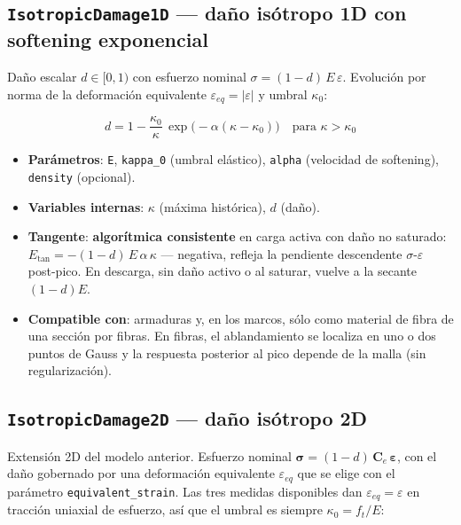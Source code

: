 \documentclass[11pt,oneside]{report}
\begin{document}
\subsection{\texttt{IsotropicDamage1D} --- daño isótropo 1D con softening exponencial}

Daño escalar $d \in [0, 1)$ con esfuerzo nominal $\sigma = (1 - d)\,E\,\varepsilon$. Evolución por norma de la deformación equivalente $\varepsilon_{eq} = |\varepsilon|$ y umbral $\kappa_0$:

\[
d = 1 - \frac{\kappa_0}{\kappa}\,\exp\bigl(-\alpha(\kappa - \kappa_0)\bigr) \quad \text{para } \kappa > \kappa_0
\]

\begin{itemize}
  \item \textbf{Parámetros}: \texttt{E}, \texttt{kappa\_0} (umbral elástico), \texttt{alpha} (velocidad de softening), \texttt{density} (opcional).
  \item \textbf{Variables internas}: $\kappa$ (máxima histórica), $d$ (daño).
  \item \textbf{Tangente}: \textbf{algorítmica consistente} en carga activa con daño no saturado: $E_{\text{tan}} = -(1 - d)\,E\,\alpha\,\kappa$ --- negativa, refleja la pendiente descendente $\sigma$-$\varepsilon$ post-pico. En descarga, sin daño activo o al saturar, vuelve a la secante $(1-d)E$.
  \item \textbf{Compatible con}: armaduras y, en los marcos, sólo como material de fibra de una sección por fibras. En fibras, el ablandamiento se localiza en uno o dos puntos de Gauss y la respuesta posterior al pico depende de la malla (sin regularización).
\end{itemize}

\subsection{\texttt{IsotropicDamage2D} --- daño isótropo 2D}

Extensión 2D del modelo anterior. Esfuerzo nominal $\boldsymbol\sigma = (1-d)\,\mathbf C_e\,\boldsymbol\varepsilon$, con el daño gobernado por una deformación equivalente $\varepsilon_{eq}$ que se elige con el parámetro \texttt{equivalent\_\allowbreak{}strain}. Las tres medidas disponibles dan $\varepsilon_{eq} = \varepsilon$ en tracción uniaxial de esfuerzo, así que el umbral es siempre $\kappa_0 = f_t/E$:
\end{document}

